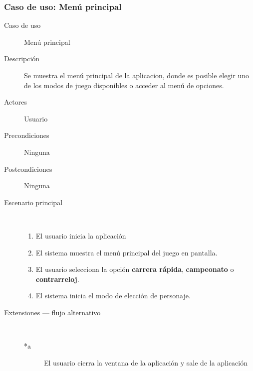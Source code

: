 \subsubsection{Caso de uso: Menú principal}

\begin{description}
    \item[Caso de uso] Menú principal
    \item[Descripción] Se muestra el menú principal de la aplicacion, donde es posible elegir uno de los modos de juego disponibles
    o acceder al menú de opciones.
    \item[Actores] Usuario
    \item[Precondiciones] Ninguna
    \item[Postcondiciones] Ninguna
    \item[Escenario principal] $\quad$
        \begin{enumerate}
            \item El usuario inicia la aplicación
            \item El sistema muestra el menú principal del juego en pantalla.
            \item El usuario selecciona la opción \textbf{carrera rápida}, \textbf{campeonato} o \textbf{contrarreloj}.
            \item El sistema inicia el modo de elección de personaje.
        \end{enumerate}
    \item[Extensiones --- flujo alternativo] $\quad$
        \begin{description}
            \item[*a ] El usuario cierra la ventana de la aplicación y sale de la aplicación
            
            
            

\end{description}
\end{description}
